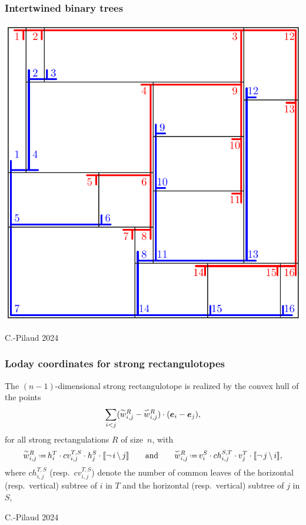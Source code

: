 \documentclass[11pt]{beamer}%
\newcommand{\red}{\color{darkred}}
\newcommand{\green}{\color{darkgreen}}
\newcommand{\auth}[1]{{\green\hfill{\footnotesize #1}}}
\renewcommand{\em }{\red}
\newcommand{\eqdef}{\mbox{\,\raisebox{0.2ex}{\scriptsize\ensuremath{\mathrm:}}\ensuremath{=}\,}} %
\renewcommand{\b}[1]{{\boldsymbol{#1}}} %
\newcommand{\yin}[1]{\smash{\overset{\sim}{#1}}}
\newcommand{\yang}[1]{\smash{\overset{\backsim}{#1}}}
\begin{document}
\begin{frame}
  \frametitle{Intertwined binary trees}
  \begin{center}
    \includegraphics[height=.7\textheight]{strongRectangulationTrees.pdf}
  \end{center}
  \auth{C.-Pilaud 2024}
\end{frame}

\begin{frame}
  \frametitle{Loday coordinates for strong rectangulotopes}

  \begin{theorem}
  The $(n-1)$-dimensional strong rectangulotope is realized by the convex hull of the points
  \[
  \sum_{i< j} (\yin{w}^R_{i,j} - \yang{w}^R_{i,j})\cdot (\b{e}_i - \b{e}_j),
  \]
   for all strong rectangulations $R$ of size~$n$, with
  \[
    \yin{w}^R_{i,j} \eqdef h^T_i \cdot cv^{T,S}_{i,j}\cdot h^S_ j\cdot \llbracket \neg \, i \, \backslash \, j \rrbracket
    \qquad\text{and}\qquad
    \yang{w}^R_{i,j} \eqdef v^S_i \cdot ch^{S,T}_{i,j}\cdot v^T_j \cdot \llbracket \neg \, j \, \backslash \, i \rrbracket,
  \]
 where $ch^{T,S}_{i,j}$ (resp.~$cv^{T,S}_{i,j}$) denote the number of {\em common leaves} of the horizontal (resp.~vertical) subtree of $i$ in $T$ and the horizontal (resp.~vertical) subtree of $j$ in $S$,
  \end{theorem}
  \auth{C.-Pilaud 2024}
\end{frame}
\end{document}
